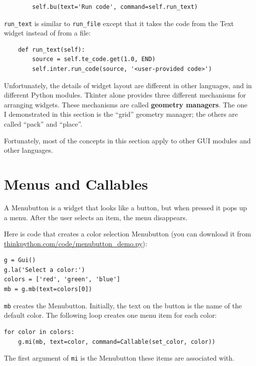\documentclass[10pt]{book}
\begin{document}
{\begin{verbatim}
        self.bu(text='Run code', command=self.run_text)
\end{verbatim}
\afterverb
%
\verb"run_text" is similar to \verb"run_file" except that it takes
the code from the Text widget instead of from a file:

\beforeverb
\begin{verbatim}
    def run_text(self):
        source = self.te_code.get(1.0, END)
        self.inter.run_code(source, '<user-provided code>')
\end{verbatim}
\afterverb
%
Unfortunately, the details of widget layout are different in
other languages, and in different Python modules.
Tkinter alone provides three different mechanisms for arranging
widgets.  These mechanisms are called {\bf geometry managers}.
The one I demonstrated in this section is the ``grid'' geometry
manager; the others are called ``pack'' and ``place''.


Fortunately, most of the concepts in this section apply to
other GUI modules and other languages.


\section{Menus and Callables}


A Menubutton is a widget that looks like a button, but when pressed
it pops up a menu.  After the user selects an item, the menu
disappears.

Here is code that creates a color selection Menubutton
(you can download it from \url{thinkpython.com/code/menubutton_demo.py}):


\beforeverb
\begin{verbatim}
g = Gui()
g.la('Select a color:')
colors = ['red', 'green', 'blue']
mb = g.mb(text=colors[0])
\end{verbatim}
\afterverb
%
{\tt mb} creates the Menubutton.  Initially, the text on the button is
the name of the default color.  The following loop creates one menu
item for each color:

\beforeverb
\begin{verbatim}
for color in colors:
    g.mi(mb, text=color, command=Callable(set_color, color))
\end{verbatim}
\afterverb
%
The first argument of {\tt mi} is the Menubutton these items are
associated with.

}
\end{document}
